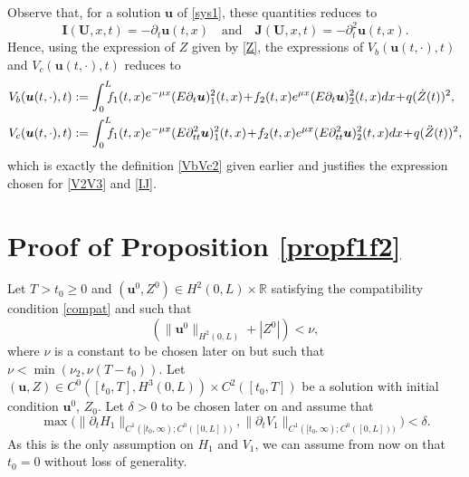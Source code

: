 Observe that{, for a solution $\boldsymbol{u}$ of \eqref{sys1}, these quantities reduces to
\[
\boldsymbol{I}(\boldsymbol{U},x,t)=-\partial_{t}\boldsymbol{u}(t,x)\quad\text{and}\quad\boldsymbol{J}(\boldsymbol{U},x,t)=-\partial_{t}^{2}\boldsymbol{u}(t,x).
\]
Hence, using the expression of $Z$ given by \eqref{Z}, the expressions of $V_{b}(\boldsymbol{u}(t,\cdot),t)$ and $V_{c}(\boldsymbol{u}(t,\cdot),t)$ reduces to}
\begin{align*}
V_{b}(\boldsymbol{u}(t,\cdot),t)&:=\int_{0}^{L}\hspace*{-2mm}f_{1}(t,x)e^{-\mu x}(E\partial_{t}\boldsymbol{u})_{1}^{2}(t,x)\!+\!f_{2}(t,x)e^{\mu x}(E\partial_{t}\boldsymbol{u})_{2}^{2}(t,x)dx\!+\!q(\dot Z(t))^{2},\\
V_{c}(\boldsymbol{u}(t,\cdot),t)&:=\int_{0}^{L}\hspace*{-2mm}f_{1}(t,x)e^{-\mu x}(E\partial_{tt}^{2}\boldsymbol{u})_{1}^{2}(t,x)\!+\!f_{2}(t,x)e^{\mu x}(E\partial_{tt}^{2}\boldsymbol{u})_{2}^{2}(t,x)dx\!+\!q(\ddot Z(t))^{2},
\end{align*}
{which is exactly the definition \eqref{VbVc2} given earlier and} justifies the expression chosen for \eqref{V2V3} and \eqref{IJ}.

\section{Proof of Proposition \ref{propf1f2}}
\label{sec:propf1f2}
Let $T>{t_{0}\geq0}$ and $(\boldsymbol{u}^{0},Z^{0})\in H^{2}(0,L)\times\mathbb{R}$ satisfying the compatibility condition \eqref{compat} and such that
\begin{equation*}
\left(\lVert \boldsymbol{u}^{0}\rVert_{H^{2}(0,L)}+|Z^{0}|\right)<\nu,
\end{equation*}
where $\nu$ is a constant to be chosen later on but such that $\nu<\min(\nu_{2},\nu({T-t_{0}}))$.
Let $(\boldsymbol{u},Z)\in C^{0}([{t_{0}},T],H^{3}(0,L))\times C^{2}([t_{0},T])$ be a solution with initial condition $\boldsymbol{u}^{0}$, $Z_{0}$.
Let $\delta>0$ to be chosen later on and assume that
\begin{equation*}
\max\bigl(\lVert\partial_{t}H_{1}\rVert_{C^{1}([t_{0},\infty);{C^{0}([0,L])})},\lVert\partial_{t}V_{1}\rVert_{C^{1}([t_{0},\infty);{C^{0}([0,L])})}\bigr)<\delta.
\end{equation*}
{As this is the only assumption on $H_{1}$ and $V_{1}$, we can assume from now on that $t_{0}=0$ without loss of generality.}

